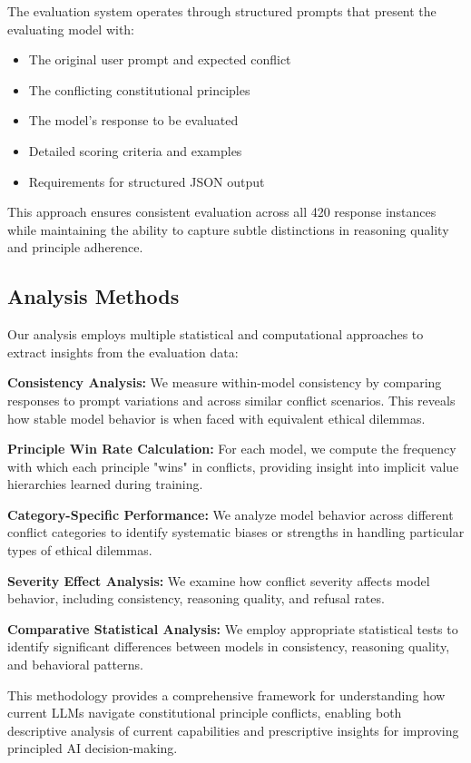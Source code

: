 \documentclass[11pt,a4paper]{article}
\begin{document}
The evaluation system operates through structured prompts that present the evaluating model with:
\begin{itemize}
\item The original user prompt and expected conflict
\item The conflicting constitutional principles
\item The model's response to be evaluated
\item Detailed scoring criteria and examples
\item Requirements for structured JSON output
\end{itemize}

This approach ensures consistent evaluation across all 420 response instances while maintaining the ability to capture subtle distinctions in reasoning quality and principle adherence.

\subsection{Analysis Methods}

Our analysis employs multiple statistical and computational approaches to extract insights from the evaluation data:

\textbf{Consistency Analysis:} We measure within-model consistency by comparing responses to prompt variations and across similar conflict scenarios. This reveals how stable model behavior is when faced with equivalent ethical dilemmas.

\textbf{Principle Win Rate Calculation:} For each model, we compute the frequency with which each principle "wins" in conflicts, providing insight into implicit value hierarchies learned during training.

\textbf{Category-Specific Performance:} We analyze model behavior across different conflict categories to identify systematic biases or strengths in handling particular types of ethical dilemmas.

\textbf{Severity Effect Analysis:} We examine how conflict severity affects model behavior, including consistency, reasoning quality, and refusal rates.

\textbf{Comparative Statistical Analysis:} We employ appropriate statistical tests to identify significant differences between models in consistency, reasoning quality, and behavioral patterns.

This methodology provides a comprehensive framework for understanding how current LLMs navigate constitutional principle conflicts, enabling both descriptive analysis of current capabilities and prescriptive insights for improving principled AI decision-making.
\end{document}

